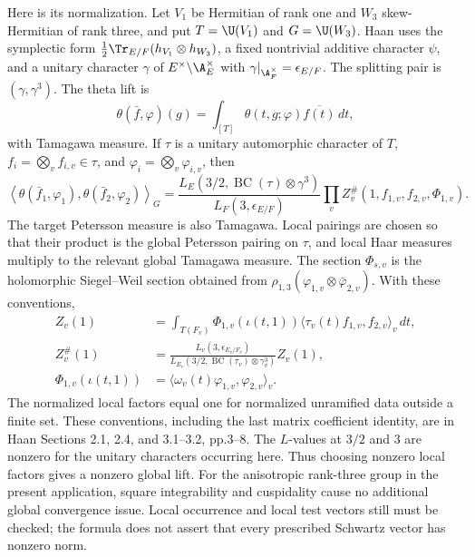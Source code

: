 Here is its normalization. Let $V_1$ be Hermitian of rank one and $W_3$
skew-Hermitian of rank three, and put $T=\U(V_1)$ and $G=\U(W_3)$.
Haan uses the symplectic form
$\frac12\Tr_{E/F}(h_{V_1}\otimes h_{W_3})$, a fixed nontrivial additive
character $\psi$, and a unitary character $\gamma$ of
$E^\times\backslash\A_E^\times$ with
$\gamma|_{\A_F^\times}=\epsilon_{E/F}$. The splitting pair is
$(\gamma,\gamma^3)$. The theta lift is
\[
 \theta(\bar f,\varphi)(g)
 =\int_{[T]}\theta(t,g;\varphi)\overline{f(t)}\,dt,
\]
with Tamagawa measure. If $\tau$ is a unitary automorphic character of
$T$, $f_i=\bigotimes_v f_{i,v}\in\tau$, and
$\varphi_i=\bigotimes_v\varphi_{i,v}$, then
\begin{equation}\label{A-Rallis}
 \left\langle\theta(\bar f_1,\varphi_1),
                    \theta(\bar f_2,\varphi_2)\right\rangle_G
 =\frac{L_E(3/2,\operatorname{BC}(\tau)\otimes\gamma^3)}
        {L_F(3,\epsilon_{E/F})}
       \prod_v Z_v^{\#}(1,f_{1,v},f_{2,v},\Phi_{1,v}).
\end{equation}
The target Petersson measure is also Tamagawa. Local pairings are
chosen so that their product is the global Petersson pairing on
$\tau$, and local Haar measures multiply to the relevant global
Tamagawa measure. The section $\Phi_{s,v}$ is the holomorphic
Siegel--Weil section obtained from
$\rho_{1,3}(\varphi_{1,v}\otimes\bar\varphi_{2,v})$. With these
conventions,
\[
\begin{split}
 Z_v(1)&=\int_{T(F_v)}\Phi_{1,v}(\iota(t,1))
               \langle\tau_v(t)f_{1,v},f_{2,v}\rangle_v\,dt,\\
 Z_v^{\#}(1)&=
 \frac{L_v(3,\epsilon_{E_v/F_v})}
 {L_{E_v}(3/2,\operatorname{BC}(\tau_v)\otimes\gamma_v^3)}Z_v(1),\\
 \Phi_{1,v}(\iota(t,1))&=
       \langle\omega_v(t)\varphi_{1,v},\varphi_{2,v}\rangle_v.
\end{split}
\]
The normalized local factors equal one for normalized unramified data
outside a finite set. These conventions, including the last matrix
coefficient identity, are in Haan Sections 2.1, 2.4, and 3.1--3.2,
pp.3--8. The $L$-values at $3/2$ and $3$ are nonzero for the unitary
characters occurring here. Thus choosing nonzero local factors gives a
nonzero global lift. For the anisotropic rank-three group in the present
application, square integrability and cuspidality cause no additional
global convergence issue. Local occurrence and local test vectors still
must be checked; the formula does not assert that every prescribed
Schwartz vector has nonzero norm.

